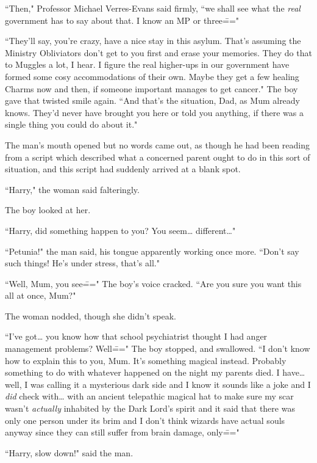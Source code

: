 ``Then," Professor Michael Verres-Evans said firmly, ``we shall see what the \emph{real} government has to say about that. I know an MP or three\==="

``They'll say, you're crazy, have a nice stay in this asylum. That's assuming the Ministry Obliviators don't get to you first and erase your memories. They do that to Muggles a lot, I hear. I figure the real higher-ups in our government have formed some cosy accommodations of their own. Maybe they get a few healing Charms now and then, if someone important manages to get cancer." The boy gave that twisted smile again. ``And that's the situation, Dad, as Mum already knows. They'd never have brought you here or told you anything, if there was a single thing you could do about it."

The man's mouth opened but no words came out, as though he had been reading from a script which described what a concerned parent ought to do in this sort of situation, and this script had suddenly arrived at a blank spot.

``Harry," the woman said falteringly.

The boy looked at her.

``Harry, did something happen to you? You seem{\ldots} different{\ldots}"

``Petunia!" the man said, his tongue apparently working once more. ``Don't say such things! He's under stress, that's all."

``Well, Mum, you see\===" The boy's voice cracked. ``Are you sure you want this all at once, Mum?"

The woman nodded, though she didn't speak.

``I've got{\ldots} you know how that school psychiatrist thought I had anger management problems? Well\===" The boy stopped, and swallowed. ``I don't know how to explain this to you, Mum. It's something magical instead. Probably something to do with whatever happened on the night my parents died. I have{\ldots} well, I was calling it a mysterious dark side and I know it sounds like a joke and I \emph{did} check with{\ldots} with an ancient telepathic magical hat to make sure my scar wasn't \emph{actually} inhabited by the Dark Lord's spirit and it said that there was only one person under its brim and I don't think wizards have actual souls anyway since they can still suffer from brain damage, only\==="

``Harry, slow down!" said the man.

